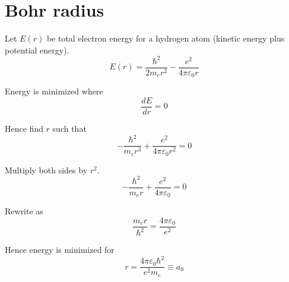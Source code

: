 

\section*{Bohr radius}

Let $E(r)$ be total electron energy for a hydrogen atom (kinetic energy plus potential energy).
\begin{equation*}
E(r)=\frac{\hbar^2}{2m_er^2}-\frac{e^2}{4\pi\varepsilon_0r}
\end{equation*}

Energy is minimized where
\begin{equation*}
\frac{dE}{dr}=0
\end{equation*}

Hence find $r$ such that
\begin{equation*}
-\frac{\hbar^2}{m_er^3}+\frac{e^2}{4\pi\varepsilon_0r^2}=0
\end{equation*}

Multiply both sides by $r^2$.
\begin{equation*}
-\frac{\hbar^2}{m_er}+\frac{e^2}{4\pi\varepsilon_0}=0
\end{equation*}

Rewrite as
\begin{equation*}
\frac{m_er}{\hbar^2}=\frac{4\pi\varepsilon_0}{e^2}
\end{equation*}

Hence energy is minimized for
\begin{equation*}
r=\frac{4\pi\varepsilon_0\hbar^2}{e^2m_e}\equiv a_0
\end{equation*}



